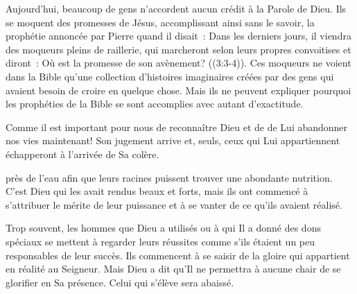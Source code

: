 
Aujourd'hui, beaucoup de gens n'accordent aucun crédit à la Parole de Dieu.
 Ils se moquent des promesses de Jésus, accomplissant ainsi sans le savoir,
 la prophétie annoncée par Pierre quand il disait~: 
 \og Dans les derniers jours, il viendra des moqueurs pleins de raillerie,
 qui marcheront selon leurs propres convoitises et diront~:
 Où est la promesse de son avènement? \fg{}
 ((3:3-4)).
 Ces moqueurs ne voient dans la Bible qu'une collection d'histoires imaginaires
 créées par des gens qui avaient besoin de croire en quelque chose.
 Mais ils ne peuvent expliquer pourquoi les prophéties de la Bible
 se sont accomplies avec autant d'exactitude. 

Comme il est important pour nous de reconnaître Dieu et de de Lui abandonner
 nos vies maintenant! Son jugement arrive et, seuls, ceux qui Lui appartiennent
 échapperont à l'arrivée de Sa colère. 

\dvrule






 près de l'eau afin que leurs racines puissent trouver une abondante nutrition.
 C'est Dieu qui les avait rendus beaux et forts,
 mais ils ont commencé à s'attribuer le mérite de leur puissance
 et à se vanter de ce qu'ils avaient réalisé.


Trop souvent, les hommes que Dieu a utilisés ou à qui Il a donné des dons
 spéciaux se mettent à regarder leurs réussites comme s'ils étaient
 un peu responsables de leur succès.
 Ils commencent à se saisir de la gloire qui appartient en réalité au Seigneur.
 Mais Dieu a dit qu'Il ne permettra à aucune chair de se glorifier
 en Sa présence. Celui qui s'élève sera abaissé.

